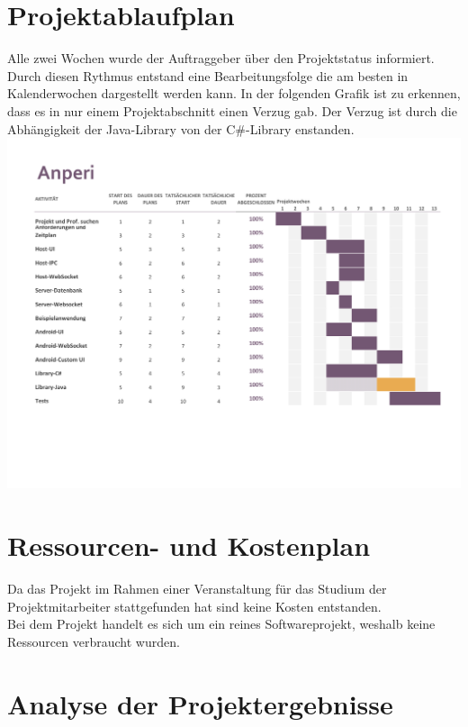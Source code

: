 \documentclass{scrartcl}
\begin{document}
\section{Projektablaufplan}
Alle zwei Wochen wurde der Auftraggeber über den Projektstatus informiert.
Durch diesen Rythmus entstand eine Bearbeitungsfolge die am besten in Kalenderwochen dargestellt werden kann.
In der folgenden Grafik ist zu erkennen, dass es in nur einem Projektabschnitt einen Verzug gab. Der Verzug ist durch die Abhängigkeit der Java-Library von der C\#-Library enstanden.
\includegraphics[scale=0.65]{Projektablaufplan.pdf}

\section{Ressourcen- und Kostenplan}
Da das Projekt im Rahmen einer Veranstaltung für das Studium der Projektmitarbeiter stattgefunden hat sind keine Kosten entstanden. \\
Bei dem Projekt handelt es sich um ein reines Softwareprojekt, weshalb keine Ressourcen verbraucht wurden. 

\section{Analyse der Projektergebnisse}
\end{document}

